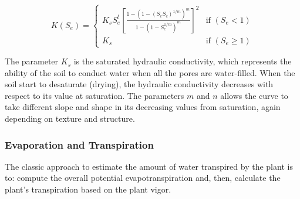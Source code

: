 \begin{equation}
\label{ippisch2} K(S_e)=          \left\{ \begin{array}{ll}
K_s S_e^l \left[\frac{1-(1-(S_e S_c)^{1/m})^m}{1-(1-S_c^{1/m})^m} \right]^{2} &\mbox{if $(S_e < 1)$}\\
K_s                             &\mbox{if $(S_e \geq 1)$}
           \end{array}
        \right.
\end{equation}

The parameter $K_s$ is the saturated hydraulic conductivity, which represents the ability of the soil to conduct water when all the pores are water-filled. When the soil start to desaturate (drying), the hydraulic conductivity decreases with respect to its value at saturation.
The parameters $m$ and $n$ allows the curve to take different slope and shape in its decreasing values from saturation, again depending on texture and structure. 

\subsubsection{Evaporation and Transpiration}
\label{orchard-sec:evapotrans}
The classic approach to estimate the amount of water transpired by the plant is to: compute the overall potential evapotranspiration and, then, calculate the plant's transpiration based on the plant vigor.

